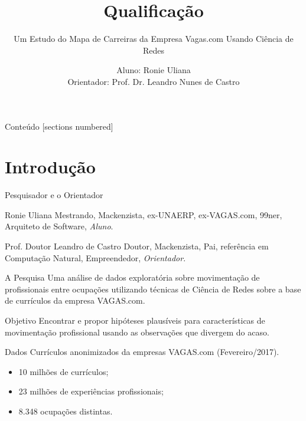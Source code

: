 \documentclass[10pt, hyperref={pdfpagelabels=false}]{beamer}
\title{Qualificação}
\subtitle{Um Estudo do Mapa de Carreiras da Empresa Vagas.com Usando Ciência de Redes}
\date{}
\author{Aluno: Ronie Uliana \\ Orientador: Prof. Dr. Leandro Nunes de Castro}
\institute{Universidade Presbiteriana Mackenzie}
\begin{document}
\maketitle

\begin{frame}{Conteúdo}
  [sections numbered]
  \tableofcontents[hideallsubsections]
\end{frame}

\section{Introdução}

\begin{frame}[fragile, label=pessoas]{Pesquisador e o Orientador}

  \begin{alertblock}{Ronie Uliana}
    Mestrando, Mackenzista, ex-UNAERP, ex-VAGAS.com, 99ner, Arquiteto de Software, \textit{Aluno}.
  \end{alertblock}
  
  \begin{alertblock}{Prof. Doutor Leandro de Castro}
    Doutor, Mackenzista, Pai, referência em Computação Natural, Empreendedor, \textit{Orientador}.
  \end{alertblock}
\end{frame}

\begin{frame}[fragile, label=pesquisa]{A Pesquisa}
  Uma \alert{análise de dados exploratória} sobre movimentação de profissionais entre ocupações utilizando técnicas de \alert{Ciência de Redes} sobre a base de currículos da empresa VAGAS.com.
\end{frame}

\begin{frame}[fragile, label=objetivo]{Objetivo}
  Encontrar e propor \alert{hipóteses} plausíveis para características de movimentação profissional usando as observações que divergem do acaso.
\end{frame}

\begin{frame}[fragile, label=dados]{Dados}
  Currículos anonimizados da empresas VAGAS.com (Fevereiro/2017).
  
  \begin{itemize}
    \item 10 milhões de currículos;\\
    \item 23 milhões de experiências profissionais;\\
    \item 8.348 ocupações distintas.
  \end{itemize}
\end{frame}
\end{document}

